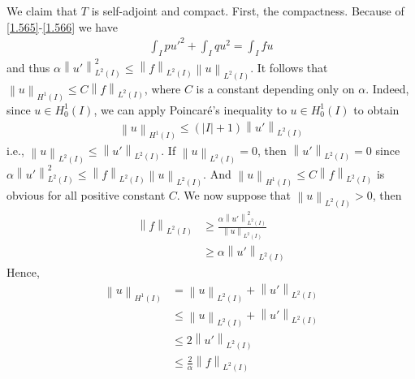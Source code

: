 \documentclass[a4paper,oneside]{book}
\numberwithin{equation}{chapter}
\begin{document}
We claim that $T$ is self-adjoint and compact. First, the compactness. Because of \eqref{1.565}-\eqref{1.566} we have
\begin{align}
\int_I {pu{'^2}}  + \int_I {q{u^2}}  = \int_I {fu} 
\end{align}
and thus $\alpha \left\| {u'} \right\|_{{L^2}\left( I \right)}^2 \le {\left\| f \right\|_{{L^2}\left( I \right)}}{\left\| u \right\|_{{L^2}\left( I \right)}}$. It follows that ${\left\| u \right\|_{{H^1}\left( I \right)}} \le C{\left\| f \right\|_{{L^2}\left( I \right)}}$, where $C$ is a constant depending only on $\alpha$. Indeed, since $u\in H_0^1\left(I\right)$, we can apply Poincar\'{e}'s inequality to $u\in H_0^1\left(I\right)$ to obtain
\begin{align}
{\left\| u \right\|_{{H^1}\left( I \right)}} \le \left( {\left| I \right| + 1} \right){\left\| {u'} \right\|_{{L^2}\left( I \right)}}
\end{align}
i.e., ${\left\| u \right\|_{{L^2}\left( I \right)}} \le {\left\| {u'} \right\|_{{L^2}\left( I \right)}}$. If ${\left\| u \right\|_{{L^2}\left( I \right)}}=0$, then ${\left\| {u'} \right\|_{{L^2}\left( I \right)}}=0$ since $\alpha \left\| {u'} \right\|_{{L^2}\left( I \right)}^2 \le {\left\| f \right\|_{{L^2}\left( I \right)}}{\left\| u \right\|_{{L^2}\left( I \right)}}$. And ${\left\| u \right\|_{{H^1}\left( I \right)}} \le C{\left\| f \right\|_{{L^2}\left( I \right)}}$ is obvious for all positive constant $C$. We now suppose that ${\left\| u \right\|_{{L^2}\left( I \right)}}>0$, then
\begin{align}
{\left\| f \right\|_{{L^2}\left( I \right)}} &\ge \frac{{\alpha \left\| {u'} \right\|_{{L^2}\left( I \right)}^2}}{{{{\left\| u \right\|}_{{L^2}\left( I \right)}}}}\\
& \ge \alpha {\left\| u' \right\|_{{L^2}\left( I \right)}}
\end{align}
Hence,
\begin{align}
{\left\| u \right\|_{{H^1}\left( I \right)}} &= {\left\| u \right\|_{{L^2}\left( I \right)}} + {\left\| {u'} \right\|_{{L^2}\left( I \right)}}\\
& \le {\left\| u \right\|_{{L^2}\left( I \right)}} + {\left\| {u'} \right\|_{{L^2}\left( I \right)}}\\
& \le 2{\left\| {u'} \right\|_{{L^2}\left( I \right)}}\\
& \le \frac{2}{\alpha }{\left\| f \right\|_{{L^2}\left( I \right)}}
\end{align}
\end{document}
